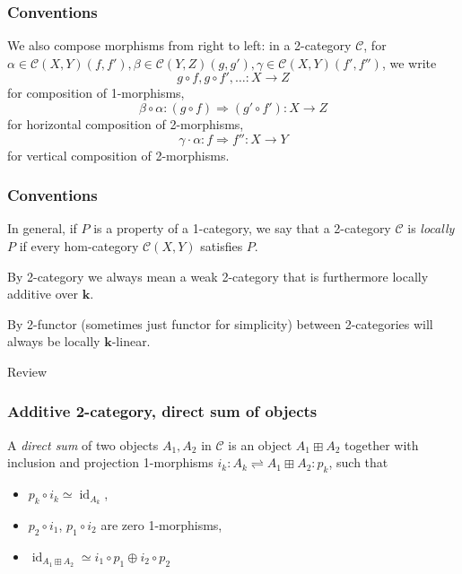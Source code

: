 \documentclass{beamer}
\newcommand{\kk}{{\mathbf{k}}}
\DeclareMathOperator{\id}{id}
\newcommand{\cC}{{\mathcal{C}}}
\begin{document}
\begin{frame}
\frametitle{Conventions}
We also compose morphisms from right to left:
in a 2-category $\cC$,
for $\alpha \in \cC(X,Y)(f,f'),
\beta \in \cC(Y,Z)(g,g'),
\gamma \in \cC(X,Y)(f',f'')$,
we write
\[
g \circ f, g \circ f', \ldots : X \to Z
\]
for composition of 1-morphisms,
\[
\beta \circ \alpha: (g \circ f) \Rightarrow (g' \circ f'):
	X \to Z
\]
for horizontal composition of 2-morphisms,
\[
\gamma \cdot \alpha: f \Rightarrow f'' : X \to Y
\]
for vertical composition of 2-morphisms.

\end{frame}


\begin{frame}
\frametitle{Conventions}
In general, if $P$ is a property of a 1-category,
we say that a 2-category $\cC$ is \emph{locally $P$}
if every hom-category $\cC(X,Y)$ satisfies $P$.

\pause

By 2-category we always mean a weak 2-category
that is furthermore locally additive over $\kk$.

By 2-functor (sometimes just functor for simplicity)
between 2-categories will always be locally $\kk$-linear.

\end{frame}

\begin{frame}

\begin{center}
\Huge Review
\end{center}
\end{frame}

\begin{frame}
\frametitle{Additive 2-category, direct sum of objects}

\begin{definition}
A \emph{direct sum} of two objects $A_1,A_2$ in $\cC$
is an object $A_1 \boxplus A_2$ together with
inclusion and projection 1-morphisms
$i_k : A_k \rightleftharpoons A_1 \boxplus A_2 : p_k$,
such that
\begin{itemize}
\item $p_k \circ i_k \simeq \id_{A_k}$,
\item $p_2 \circ i_1$, $p_1 \circ i_2$ are zero 1-morphisms,
\item $\id_{A_1 \boxplus A_2} \simeq
	i_1 \circ p_1 \oplus i_2 \circ p_2$
\end{itemize}
\end{definition}


\end{frame}
\end{document}
